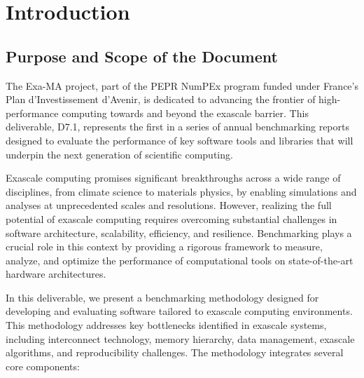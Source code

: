 
\clearpage
\section{Introduction}
\label{sec:introduction}


\subsection{Purpose and Scope of the Document}
\label{sec:purpose}


The Exa-MA project, part of the PEPR NumPEx program funded under France’s Plan d’Investissement d’Avenir, is dedicated to advancing the frontier of high-performance computing towards and beyond the exascale barrier. This deliverable, D7.1, represents the first in a series of annual benchmarking reports designed to evaluate the performance of key software tools and libraries that will underpin the next generation of scientific computing.

Exascale computing promises significant breakthroughs across a wide range of disciplines, from climate science to materials physics, by enabling simulations and analyses at unprecedented scales and resolutions. However, realizing the full potential of exascale computing requires overcoming substantial challenges in software architecture, scalability, efficiency, and resilience. Benchmarking plays a crucial role in this context by providing a rigorous framework to measure, analyze, and optimize the performance of computational tools on state-of-the-art hardware architectures.

In this deliverable, we present a benchmarking methodology designed for developing and evaluating software tailored to exascale computing environments. This methodology addresses key bottlenecks identified in exascale systems, including interconnect technology, memory hierarchy, data management, exascale algorithms, and reproducibility challenges. The methodology integrates several core components:

